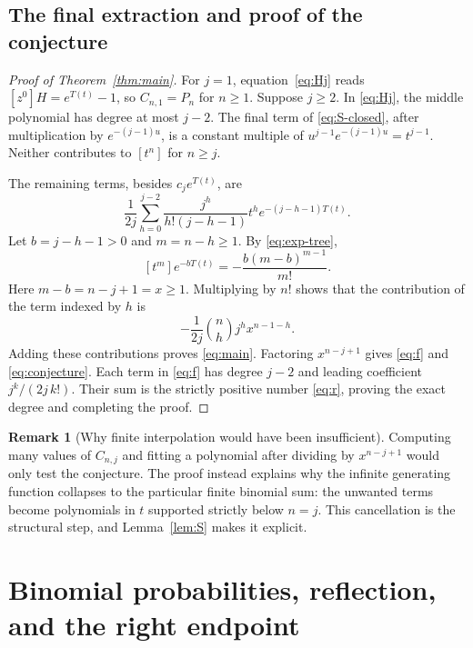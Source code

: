 \documentclass[11pt,letterpaper]{article}
\numberwithin{equation}{section}
\theoremstyle{definition}
\newtheorem{remark}[theorem]{Remark}
\begin{document}
\subsection{The final extraction and proof of the conjecture}
\begin{proof}[Proof of Theorem~\ref{thm:main}]
For $j=1$, equation~\eqref{eq:Hj} reads
$[z^0]H=e^{T(t)}-1$, so $C_{n,1}=P_n$ for $n\ge1$.
Suppose $j\ge2$. In \eqref{eq:Hj}, the middle polynomial has degree at most
$j-2$. The final term of \eqref{eq:S-closed}, after multiplication by
$e^{-(j-1)u}$, is a constant multiple of
$u^{j-1}e^{-(j-1)u}=t^{j-1}$. Neither contributes to $[t^n]$ for $n\ge j$.

The remaining terms, besides $c_je^{T(t)}$, are
\[
 \frac1{2j}\sum_{h=0}^{j-2}
 \frac{j^h}{h!(j-h-1)}t^h e^{-(j-h-1)T(t)}.
\]
Let $b=j-h-1>0$ and $m=n-h\ge1$. By \eqref{eq:exp-tree},
\[
 [t^m]e^{-bT(t)}=-\frac{b(m-b)^{m-1}}{m!}.
\]
Here $m-b=n-j+1=x\ge1$. Multiplying by $n!$ shows that the contribution
of the term indexed by $h$ is
\[
 -\frac1{2j}\binom nh j^h x^{n-1-h}.
\]
Adding these contributions proves \eqref{eq:main}.
Factoring $x^{n-j+1}$ gives \eqref{eq:f} and \eqref{eq:conjecture}.
Each term in \eqref{eq:f} has degree $j-2$ and leading coefficient
$j^k/(2j\,k!)$. Their sum is the strictly positive number \eqref{eq:r},
proving the exact degree and completing the proof.
\end{proof}

\begin{remark}[Why finite interpolation would have been insufficient]
Computing many values of $C_{n,j}$ and fitting a polynomial after dividing
by $x^{n-j+1}$ would only test the conjecture. The proof instead explains
why the infinite generating function collapses to the particular finite
binomial sum: the unwanted terms become polynomials in $t$ supported
strictly below $n=j$. This cancellation is the structural step, and
Lemma~\ref{lem:S} makes it explicit.
\end{remark}

\section{Binomial probabilities, reflection, and the right endpoint}
\label{sec:reflection}
\end{document}
